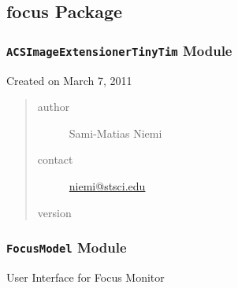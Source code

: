 \documentclass[letterpaper,10pt,english]{sphinxmanual}
\begin{document}

\begin{fulllineitems}
\label{SamPy.fitting:SamPy.fitting.weigtedFittingExample.third_order}
\end{fulllineitems}



\subsection{focus Package}
\label{SamPy.focus:focus-package}\label{SamPy.focus::doc}

\subsubsection{\texttt{ACSImageExtensionerTinyTim} Module}
\label{SamPy.focus:acsimageextensionertinytim-module}\label{SamPy.focus:module-SamPy.focus.ACSImageExtensionerTinyTim}
Created on March 7, 2011
\begin{quote}\begin{description}
\item[{author}] \leavevmode
Sami-Matias Niemi

\item[{contact}] \leavevmode
\href{mailto:niemi@stsci.edu}{niemi@stsci.edu}

\item[{version}] 

\end{description}\end{quote}


\begin{fulllineitems}
\label{SamPy.focus:SamPy.focus.ACSImageExtensionerTinyTim.parse_parameterfile}
\end{fulllineitems}



\subsubsection{\texttt{FocusModel} Module}
\label{SamPy.focus:focusmodel-module}\label{SamPy.focus:module-SamPy.focus.FocusModel}
User Interface for Focus Monitor
\end{document}
